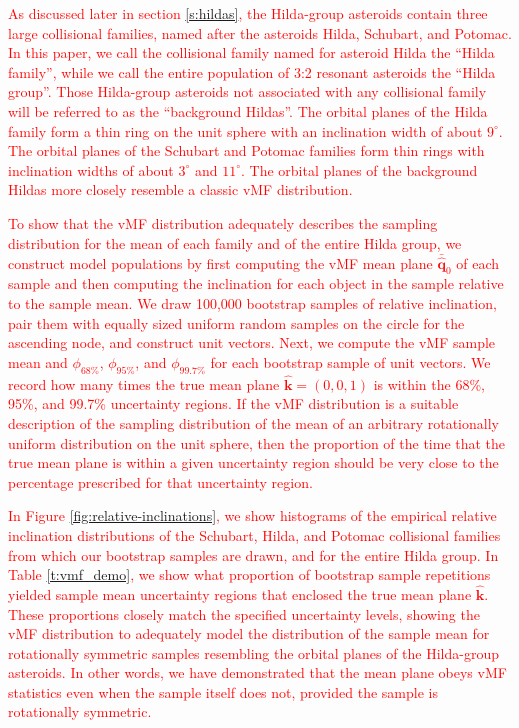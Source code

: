 \documentclass[a4paper,fleqn]{cas-sc}
\begin{document}
\begin{linenumbers}
\textcolor{red}{
As discussed later in section \ref{s:hildas}, the Hilda-group asteroids contain three large collisional families, named after the asteroids Hilda, Schubart, and Potomac.
In this paper, we call the collisional family named for asteroid Hilda the ``Hilda family'', while we call the entire population of 3:2 resonant asteroids the ``Hilda group''.
Those Hilda-group asteroids not associated with any collisional family will be referred to as the ``background Hildas''.
The orbital planes of the Hilda family form a thin ring on the unit sphere with an inclination width of about $9^\circ$.
The orbital planes of the Schubart and Potomac families form thin rings with inclination widths of about $3^\circ$ and $11^\circ$.
The orbital planes of the background Hildas more closely resemble a classic vMF distribution.
}

\textcolor{red}{
To show that the vMF distribution adequately describes the sampling distribution for the mean of each family and of the entire Hilda group, we construct model populations by first computing the vMF mean plane $\bar{\hat{\mathbf{q}}}_0$ of each sample and then computing the inclination for each object in the sample relative to the sample mean.
We draw 100,000 bootstrap samples of relative inclination, pair them with equally sized uniform random samples on the circle for the ascending node, and construct unit vectors.
Next, we compute the vMF sample mean and $\phi_{68\%}$, $\phi_{95\%}$, and $\phi_{99.7\%}$ for each bootstrap sample of unit vectors.
We record how many times the true mean plane $\hat{\mathbf{k}}=(0,0,1)$ is within the 68\%, 95\%, and 99.7\% uncertainty regions.
If the vMF distribution is a suitable description of the sampling distribution of the mean of an arbitrary rotationally uniform distribution on the unit sphere, then the proportion of the time that the true mean plane is within a given uncertainty region should be very close to the percentage prescribed for that uncertainty region.
}

\textcolor{red}{
In Figure \ref{fig:relative-inclinations}, we show histograms of the empirical relative inclination distributions of the Schubart, Hilda, and Potomac collisional families from which our bootstrap samples are drawn, and for the entire Hilda group.
In Table \ref{t:vmf_demo}, we show what proportion of bootstrap sample repetitions yielded sample mean uncertainty regions that enclosed the true mean plane $\hat{\mathbf{k}}$.
These proportions closely match the specified uncertainty levels, showing the vMF distribution to adequately model the distribution of the sample mean for rotationally symmetric samples resembling the orbital planes of the Hilda-group asteroids.
In other words, we have demonstrated that the mean plane obeys vMF statistics even when the sample itself does not, provided the sample is rotationally symmetric. 
}


\end{linenumbers}
\end{document}

